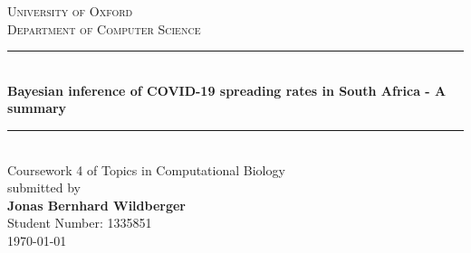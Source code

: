 \begin{titlepage}
	
	\begin{center}
		
		
		
		
		
		\textsc{\Large University of Oxford}\\[0.2cm]
		\textsc{Department of Computer Science}\\[0.2cm]
		\renewcommand{\HRule}{\rule{\linewidth}{0.5mm}}
		\HRule \\[.9cm]
		{ \huge \bfseries Bayesian inference of COVID-19 spreading rates in South Africa - A summary}\\[0.6cm]
	
		\HRule \\[1.3cm]
		
		{\LARGE Coursework 4 of Topics in Computational Biology} \\[0.3cm]  
		
		
		submitted by \\[0.3cm]  
		{\large \bfseries Jonas Bernhard Wildberger} \\
		{Student Number: 1335851}
		\\[12.5cm]  
		
		{\large \today}	
	\end{center}
	
	
\end{titlepage}
